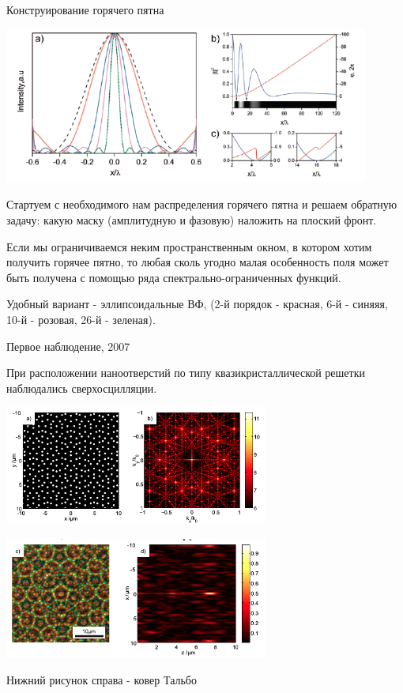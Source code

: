 \documentclass[9pt, compress, xcolor=table]{beamer}
\begin{document}
\begin{frame}{Конструирование горячего пятна}
\begin{center}
\includegraphics[width=0.9\textwidth]{nh8}
\end{center}
{\small Стартуем с необходимого нам распределения горячего пятна и решаем обратную задачу: какую маску (амплитудную и фазовую) наложить на плоский фронт. 

Если мы ограничиваемся неким пространственным окном, в котором хотим получить горячее пятно, то любая сколь угодно малая особенность поля может быть получена с помощью ряда спектрально-ограниченных функций.

Удобный вариант - эллипсоидальные ВФ, (2-й порядок - красная, 6-й - синяяя, 10-й - розовая, 26-й - зеленая).}
\end{frame}

\begin{frame}{Первое наблюдение, 2007}

При расположении наноотверстий по типу квазикристаллической решетки наблюдались сверхосцилляции.
\begin{center}
\includegraphics[width=0.65\textwidth]{nh9}

\includegraphics[width=0.65\textwidth]{nh10}

Нижний рисунок справа - ковер Тальбо
\end{center}

\end{frame}
\end{document}

